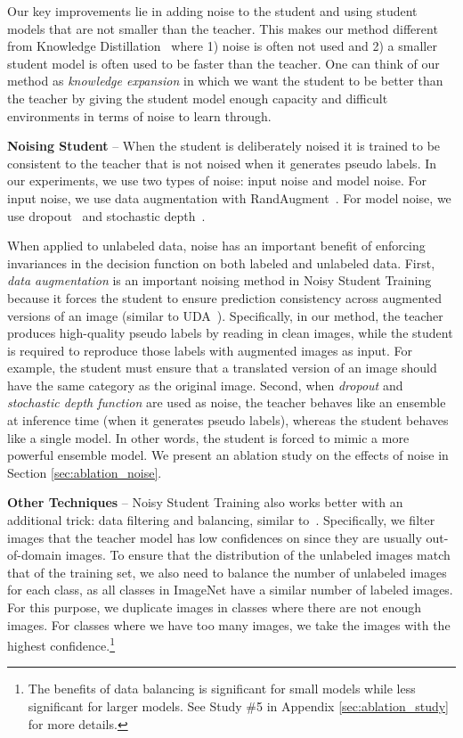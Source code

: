 \documentclass[10pt,twocolumn,letterpaper]{article}
\begin{document}
Our key improvements lie in adding noise to the student and using student models that are not smaller than the teacher. This makes our method different from Knowledge Distillation~\cite{hinton2015distilling} where 1) noise is often not used and 2) a smaller student model is often used to be faster than the teacher. One can think of our method as \emph{knowledge expansion} in which we want the student to be better than the teacher by giving the student model enough capacity and difficult environments in terms of noise to learn through.
 
{\bf Noising Student} -- When the student is deliberately noised it is trained to be consistent to the teacher that is not noised when it generates  pseudo labels.
In our experiments, we use two types of noise: input noise and model noise. For input noise, we use data augmentation with RandAugment~\cite{cubuk2019randaugment}. For model noise, we use dropout~\cite{srivastava2014dropout} and stochastic depth~\cite{huang2016deep}.

When applied to unlabeled data, noise has an important benefit of enforcing invariances in the decision function on both labeled and unlabeled data.
First, {\it data augmentation} is an important noising method in Noisy Student Training because it forces the student to ensure prediction consistency across augmented versions of an image (similar to UDA~\cite{uda}). Specifically, in our method, the teacher produces high-quality pseudo labels by reading in clean images, while the student is required to reproduce those labels with augmented images as input. For example, the student must ensure that a translated version of an image should have the same category as the original image. 
Second, when {\it dropout} and {\it stochastic depth function} are used as noise, the teacher behaves like an ensemble at inference time (when it generates pseudo labels), whereas the student behaves like a single model. In other words, the student is forced to mimic a more powerful ensemble model.
We present an ablation study on the effects of noise in Section \ref{sec:ablation_noise}.

{\bf Other Techniques} -- Noisy Student Training also works better with an additional trick: data filtering and balancing, similar to~\cite{uda,billion_large_scale}.  
Specifically, we filter images that the teacher model has low confidences on since they are usually out-of-domain images. To ensure that the distribution of the unlabeled images match that of the training set, we also need to balance the number of unlabeled images for each class, as all classes in ImageNet have a similar number of labeled images. For this purpose, we duplicate images in classes where there are not enough images. For classes where we have too many images, we take the images with the highest confidence.\footnote{The benefits of data balancing is significant for small models while less significant for larger models. See Study \#5 in Appendix \ref{sec:ablation_study} for more details.}
\end{document}
